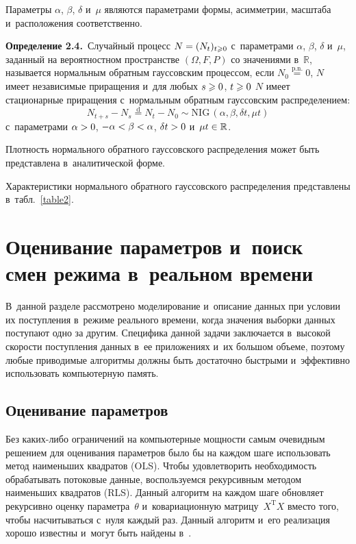 \begin{multicols}{2}
                Параметры $\alpha$, $\beta$, $\delta$ и~$\mu$ являются параметрами 
формы, асимметрии, масштаба и~расположения соответственно. 

\smallskip

\noindent
\textbf{Определение 2.4.}\
                Случайный процесс $N \hm= (N_t)_{t \geqslant 0}$ с~параметрами 
$\alpha$, $\beta$, $\delta$ и~$\mu$, заданный на вероятностном пространстве $(\Omega, 
F, P)$ со значениями  в~$\mathbb{R}$,\linebreak
 называется нормальным обратным гауссовским 
процессом, если $N_0 \overset{\mathrm{p.n.}}{=} 0$, $N$ имеет независимые приращения 
и~для любых $s \hm\geqslant 0$, $t \hm\geqslant 0$ $N$ имеет стационарные приращения 
с~нормальным обратным гауссовским распределением:
$$
    N_{t+s} - N_s  \overset{\mathrm{d}}{=} N_t - N_0 \sim 
\mathrm{NIG}\,( \alpha, \beta, \delta t, \mu t) 
  $$
        с~параметрами $\alpha \hm> 0$, 
        $-\alpha \hm< \beta \hm< \alpha$, $\delta t\hm > 0$ 
и~$\mu t \hm\in  \mathbb{R}$.

\smallskip

    Плотность нормального обратного гауссовского распределения может быть 
представлена в~аналитической форме.

        Характеристики нормального обратного гауссовского распределения 
представлены в~табл.~\ref{table2}.



\section {Оценивание параметров и~поиск смен режима в~реальном времени}

В~данной разделе рассмотрено моделирование и~описание данных при условии их 
поступления в~режиме реального времени, когда значения выборки данных поступают 
одно за другим. Специфика данной задачи заключается в~высокой скорости 
поступления данных в~ее приложениях и~их большом объеме, поэтому любые 
приводимые алгоритмы должны быть достаточно быстрыми и~эффективно использовать 
компьютерную память.

\subsection{Оценивание параметров}

Без каких-ли\-бо ограничений на компьютерные мощности самым очевидным решением для 
оценивания параметров было бы на каждом шаге использовать метод наименьших 
квадратов (OLS). Чтобы удовлетворить необходимость обрабатывать потоковые 
данные, воспользуемся рекурсивным методом наименьших квадратов (RLS). Данный 
алгоритм на каждом шаге обновляет рекурсивно оценку параметра~$\theta$ 
и~ковариационную матрицу~$X^{\mathrm{T}} X$  вмес\-то того, чтобы насчитываться с~нуля каждый 
раз. Данный алгоритм и~его реализация хорошо известны и~могут быть найдены 
в~\cite{haykin}.


\end{multicols}
